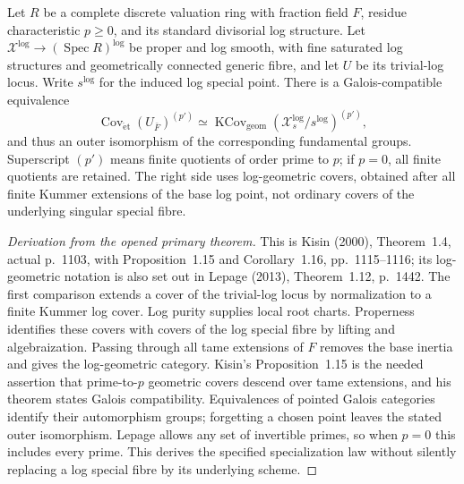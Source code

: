 \begin{theorem}
\label{A:log-specialization-higher}
Let $R$ be a complete discrete valuation ring with fraction field
$F$, residue characteristic $p\ge0$, and its standard divisorial
log structure. Let $\mathcal X^{\log}\to(\operatorname{Spec}R)^{\log}$
be proper and log smooth, with fine saturated log structures and
geometrically connected generic fibre, and let $U$ be its
trivial-log locus. Write $s^{\log}$ for the induced log special
point. There is a Galois-compatible equivalence
\[
 \operatorname{Cov}_{\mathrm{\acute et}}(U_{\bar F})^{(p')}
 \simeq
 \operatorname{KCov}_{\mathrm{geom}}
       (\mathcal X_s^{\log}/s^{\log})^{(p')},
\]
and thus an outer isomorphism of the corresponding fundamental
groups. Superscript $(p')$ means finite quotients of order prime
to $p$; if $p=0$, all finite quotients are retained. The right
side uses log-geometric covers, obtained after all finite Kummer
extensions of the base log point, not ordinary covers of the
underlying singular special fibre.
\end{theorem}

\begin{proof}[Derivation from the opened primary theorem]
This is Kisin (2000), Theorem~1.4, actual p.~1103, with
Proposition~1.15 and Corollary~1.16, pp.~1115--1116; its
log-geometric notation is also set out in Lepage (2013),
Theorem~1.12, p.~1442. The first comparison extends a cover of
the trivial-log locus by normalization to a finite Kummer log
cover. Log purity supplies local root charts. Properness identifies
these covers with covers of the log special fibre by lifting and
algebraization. Passing through all tame extensions of $F$ removes
the base inertia and gives the log-geometric category. Kisin's
Proposition~1.15 is the needed assertion that prime-to-$p$
geometric covers descend over tame extensions, and his theorem
states Galois compatibility. Equivalences of pointed Galois
categories identify their automorphism groups; forgetting a
chosen point leaves the stated outer isomorphism. Lepage allows
any set of invertible primes, so when $p=0$ this includes every
prime. This derives the specified specialization law without
silently replacing a log special fibre by its underlying scheme.
\end{proof}


